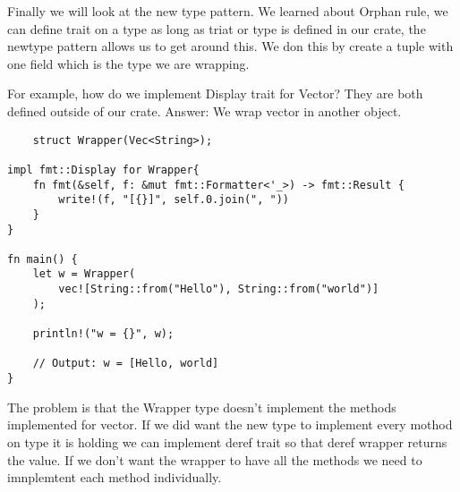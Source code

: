 Finally we will look at the new type pattern.  We learned about Orphan rule, we can define trait on a type as long as triat or type is defined in our crate, the newtype pattern allows us to get around this. We don this by create a tuple with one field which is the type we are wrapping.

For example, how do we implement Display trait for Vector? They are both defined outside of our crate. Answer: We wrap vector in another object.

\begin{lstlisting}
    struct Wrapper(Vec<String>);

impl fmt::Display for Wrapper{
    fn fmt(&self, f: &mut fmt::Formatter<'_>) -> fmt::Result {
        write!(f, "[{}]", self.0.join(", "))
    }
}

fn main() {
    let w = Wrapper(
        vec![String::from("Hello"), String::from("world")]
    );

    println!("w = {}", w);

    // Output: w = [Hello, world]
}

\end{lstlisting}

The problem is that the Wrapper type doesn't implement the methods implemented for vector. If we did want the new type to implement every mothod on type it is holding we can implement deref trait so that deref wrapper returns the value. If we don't want the wrapper to have all the methods we need to imnplemtent each method individually.



